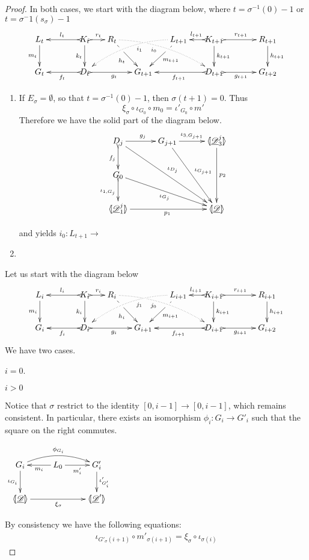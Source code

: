 \documentclass[a4paper,UKenglish,cleveref,pdftex,thm-restate,numberwithinsect]{lipics-v2021}
\def\G{\textbf {\textup{G}}}
\newcommand{\dder}[1]{\mathscr{#1}}
\newcommand{\der}[1]{\underline{\dder{#1}}}
\newcommand{\lpro}{\langle \hspace{-1.85pt}[}
\newcommand{\rpro}{]\hspace{-1.85pt}\rangle}
\newcommand{\tpro}[1]{\lpro \der{#1}\rpro}
\begin{document}
\begin{proof}
	In both cases, we start with the diagram below, where $t=\sigma^{-1}(0)-1$ or $t=\sigma{^-1}(s_\sigma)-1$
	\[\xymatrix@C=15pt{L_t \ar[d]_{m_t}&& K_t
		\ar[d]_{k_t}\ar@{>->}[ll]_{l_t} \ar@{>->}[r]^{r_t} & R_t
		\ar@{.>}@/^.35cm/[drrr]|(.3)\hole_(.4){i_0}
		\ar[dr]|(.3)\hole_{h_t} && L_{t+1} \ar@{.>}@/_.4cm/[dlll]^(.4){i_1}
		\ar[dl]|(.3)\hole^{m_{t+1}}& K_{t+1} \ar[d]^{k_{t+1}}\ar@{>->}[l]_{l_{t+1}}
		\ar@{>->}[rr]^{r_{t+1}} && R_{t+1} \ar[d]^{h_{t+1}}\\G_t && \ar@{>->}[ll]^{f_t}
		D_t \ar@{>->}[rr]_{g_t}&& G_{t+1} && \ar@{>->}[ll]^{f_{t+1}} D_{t+1}\ar@{>->}[rr]_{g_{t+1}}&& G_{t+2}}\]
	
	
	\begin{enumerate}
		\item If $E_{\sigma}=\emptyset$, so that $t=\sigma^{-1}(0)-1$, then $\sigma(t+1)=0$. Thus
		\[\xi_\sigma\circ \iota_{G_0}\circ m_{0}=\iota'_{G_0}\circ m'_{}\]
		 Therefore we have the solid part of the diagram below. \[\xymatrix@C=30pt{D_{j} \ar[ddrr]^{\iota_{D_j}}
		 	\ar[r]^{g_j}\ar@{>->}[d]_{f_j}& G_{j+1}
		 	\ar[ddr]^{\iota_{G_{j+1}}}
		 	\ar[r]^-{\iota_{3, G_{j+1}}} & \lpro \der{D}^j_3\rpro \ar[dd]^{p_2} \\
		 	G_0\ar[drr]_{\iota_{G_{j}}} \ar@{>->}[d]_{\iota_{1,G_j}}\\ \lpro
		 	\der{D}^j_1 \rpro \ar[rr]_{p_1} &&\tpro{D} }\]
		 	
		 	and yields $i_0\colon L_{t+1}\to$
		\item 
	\end{enumerate}
	Let us start with the diagram below
	\[\xymatrix@C=15pt{L_i \ar[d]_{m_i}&& K_i
		\ar[d]_{k_i}\ar@{>->}[ll]_{l_i} \ar@{>->}[r]^{r_i} & R_i
		\ar@{.>}@/^.35cm/[drrr]|(.3)\hole_(.4){j_0}
		\ar[dr]|(.3)\hole_{h_i} && L_{i+1} \ar@{.>}@/_.4cm/[dlll]^(.4){j_1}
		\ar[dl]|(.3)\hole^{m_{i+1}}& K_{i+1} \ar[d]^{k_{i+1}}\ar@{>->}[l]_{l_{i+1}}
		\ar@{>->}[rr]^{r_{i+1}} && R_{i+1} \ar[d]^{h_{i+1}}\\G_i && \ar@{>->}[ll]^{f_i}
		D_i \ar@{>->}[rr]_{g_i}&& G_{i+1} && \ar@{>->}[ll]^{f_{i+1}} D_{i+1}\ar@{>->}[rr]_{g_{i+1}}&& G_{i+2}}\]
	We have two cases.
	
	\smallskip \noindent $i=0$. 
	
	
	\smallskip\noindent $i>0$
	
	
	\parbox{9cm}{Notice that $\sigma$ restrict to the identity $[0, i-1]\to [0,i-1]$, which remains consistent. In particular, there exists an isomorphism $\phi_{i}\colon G_i\to G'_i$ such that the square on the right commutes.}
	\parbox{3cm}{\vspace{-.5cm}$\xymatrix{G_i \ar[d]_{\iota_{G_i}}\ar@/^.4cm/[rr]^{\phi_{G_i}}& L_0  \ar[l]^{m_i}\ar[r]_{m'_{i}} & G'_{i} \ar[d]^{\iota'_{G'_i}}\\ \tpro{D} \ar[rr]_{\xi_\sigma} & &\lpro\der{D}'\rpro  }$}
	
	
	
	
	By consistency we have the following equations:
	\[\begin{split}
		\iota_{G'_\sigma(i+1)}\circ m'_{\sigma(i+1)} =\xi_{\sigma}\circ \iota_{\sigma(i)}
	\end{split}\]
\end{proof}
\end{document}

